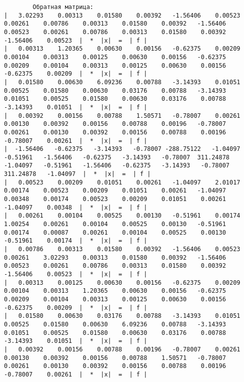 \documentclass[a4paper,12pt,titlepage,finall]{article}
\begin{document}
\begin{verbatim}
        Обратная матрица:
|   3.02293    0.00313    0.01580    0.00392   -1.56406    0.00523    0.00261    0.00786    0.00313    0.01580    0.00392   -1.56406    0.00523    0.00261    0.00786    0.00313    0.01580    0.00392   -1.56406    0.00523  |  *  |x|  =  | f |
|   0.00313    1.20365    0.00630    0.00156   -0.62375    0.00209    0.00104    0.00313    0.00125    0.00630    0.00156   -0.62375    0.00209    0.00104    0.00313    0.00125    0.00630    0.00156   -0.62375    0.00209  |  *  |x|  =  | f |
|   0.01580    0.00630    6.09236    0.00788   -3.14393    0.01051    0.00525    0.01580    0.00630    0.03176    0.00788   -3.14393    0.01051    0.00525    0.01580    0.00630    0.03176    0.00788   -3.14393    0.01051  |  *  |x|  =  | f |
|   0.00392    0.00156    0.00788    1.50571   -0.78007    0.00261    0.00130    0.00392    0.00156    0.00788    0.00196   -0.78007    0.00261    0.00130    0.00392    0.00156    0.00788    0.00196   -0.78007    0.00261  |  *  |x|  =  | f |
|  -1.56406   -0.62375   -3.14393   -0.78007 -288.75122   -1.04097   -0.51961   -1.56406   -0.62375   -3.14393   -0.78007  311.24878   -1.04097   -0.51961   -1.56406   -0.62375   -3.14393   -0.78007  311.24878   -1.04097  |  *  |x|  =  | f |
|   0.00523    0.00209    0.01051    0.00261   -1.04097    2.01017    0.00174    0.00523    0.00209    0.01051    0.00261   -1.04097    0.00348    0.00174    0.00523    0.00209    0.01051    0.00261   -1.04097    0.00348  |  *  |x|  =  | f |
|   0.00261    0.00104    0.00525    0.00130   -0.51961    0.00174    1.00254    0.00261    0.00104    0.00525    0.00130   -0.51961    0.00174    0.00087    0.00261    0.00104    0.00525    0.00130   -0.51961    0.00174  |  *  |x|  =  | f |
|   0.00786    0.00313    0.01580    0.00392   -1.56406    0.00523    0.00261    3.02293    0.00313    0.01580    0.00392   -1.56406    0.00523    0.00261    0.00786    0.00313    0.01580    0.00392   -1.56406    0.00523  |  *  |x|  =  | f |
|   0.00313    0.00125    0.00630    0.00156   -0.62375    0.00209    0.00104    0.00313    1.20365    0.00630    0.00156   -0.62375    0.00209    0.00104    0.00313    0.00125    0.00630    0.00156   -0.62375    0.00209  |  *  |x|  =  | f |
|   0.01580    0.00630    0.03176    0.00788   -3.14393    0.01051    0.00525    0.01580    0.00630    6.09236    0.00788   -3.14393    0.01051    0.00525    0.01580    0.00630    0.03176    0.00788   -3.14393    0.01051  |  *  |x|  =  | f |
|   0.00392    0.00156    0.00788    0.00196   -0.78007    0.00261    0.00130    0.00392    0.00156    0.00788    1.50571   -0.78007    0.00261    0.00130    0.00392    0.00156    0.00788    0.00196   -0.78007    0.00261  |  *  |x|  =  | f |

\end{verbatim}
\end{document}
